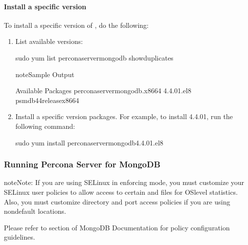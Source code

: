 \documentclass[letterpaper,10pt,english]{sphinxmanual}
\begin{document}
\paragraph{Install a specific version}
\label{\detokenize{install/yum:install-a-specific-version}}
\sphinxAtStartPar
To install a specific version of , do the following:
\begin{enumerate}
%
\item {} 
\sphinxAtStartPar
List available versions:

\begin{sphinxVerbatim}[commandchars=\\\{\}]
\PYGZdl{} sudo yum list percona\PYGZhy{}server\PYGZhy{}mongodb \PYGZhy{}\PYGZhy{}showduplicates
\end{sphinxVerbatim}

\begin{sphinxadmonition}{note}{Sample Output}

\begin{sphinxVerbatim}[commandchars=\\\{\}]
    Available Packages
percona\PYGZhy{}server\PYGZhy{}mongodb.x86\PYGZus{}64    4.4.0\PYGZhy{}1.el8       psmdb\PYGZhy{}44\PYGZhy{}release\PYGZhy{}x86\PYGZus{}64
\end{sphinxVerbatim}
\end{sphinxadmonition}

\item {} 
\sphinxAtStartPar
Install a specific version packages. For example, to install  4.4.0\sphinxhyphen{}1, run the following command:

\begin{sphinxVerbatim}[commandchars=\\\{\}]
\PYGZdl{} sudo yum install percona\PYGZhy{}server\PYGZhy{}mongodb\PYGZhy{}4.4.0\PYGZhy{}1.el8
\end{sphinxVerbatim}

\end{enumerate}


\subsubsection{Running Percona Server for MongoDB}
\label{\detokenize{install/yum:running-percona-server-for-mongodb}}
\begin{sphinxadmonition}{note}{Note:}
\sphinxAtStartPar
If you are using SELinux in enforcing mode, you must customize your SELinux user policies to allow access to certain  and  files for OS\sphinxhyphen{}level statistics. Also, you must customize directory and port access policies if you are using non\sphinxhyphen{}default locations.

\sphinxAtStartPar
Please refer to  section of MongoDB Documentation for policy configuration guidelines.
\end{sphinxadmonition}
\end{document}

